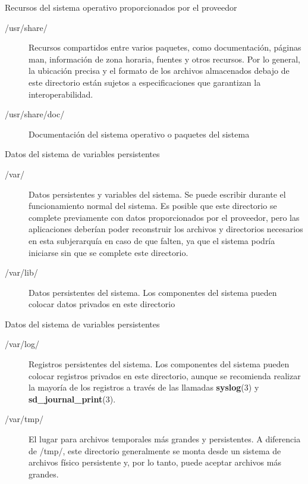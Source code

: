 \begin{frame}[c]{Recursos del sistema operativo proporcionados por el proveedor}
  \begin{description}
    \item [/usr/share/] Recursos compartidos entre varios paquetes, como
      documentación, páginas man, información de zona horaria, fuentes y otros
      recursos. Por lo general, la ubicación precisa y el formato de los
      archivos almacenados debajo de este directorio están sujetos a
      especificaciones que garantizan la interoperabilidad.
    \pausa
    \item [/usr/share/doc/] Documentación del sistema operativo o paquetes
      del sistema
  \end{description}
\end{frame}

\begin{frame}[c]{Datos del sistema de variables persistentes}
  \begin{description}
    \item [/var/] Datos persistentes y variables del sistema. Se puede escribir
      durante el funcionamiento normal del sistema. Es posible que este
      directorio se complete previamente con datos proporcionados por el
      proveedor, pero las aplicaciones deberían poder reconstruir los archivos
      y directorios necesarios en esta subjerarquía en caso de que falten, ya
      que el sistema podría iniciarse sin que se complete este directorio.
    \pausa
    \item [/var/lib/] Datos persistentes del sistema. Los componentes del
      sistema pueden colocar datos privados en este directorio
  \end{description}
\end{frame}

\begin{frame}[c]{Datos del sistema de variables persistentes}
  \begin{description}
    \item [/var/log/] Registros persistentes del sistema. Los componentes del
      sistema pueden colocar registros privados en este directorio, aunque se
      recomienda realizar la mayoría de los registros a través de las
      llamadas \textbf{syslog}(3)  y \textbf{sd\_journal\_print}(3).
    \pausa
    \item [/var/tmp/] El lugar para archivos temporales más grandes y
      persistentes. A diferencia de /tmp/, este directorio generalmente se
      monta desde un sistema de archivos físico persistente y, por lo tanto,
      puede aceptar archivos más grandes.
  \end{description}
\end{frame}

